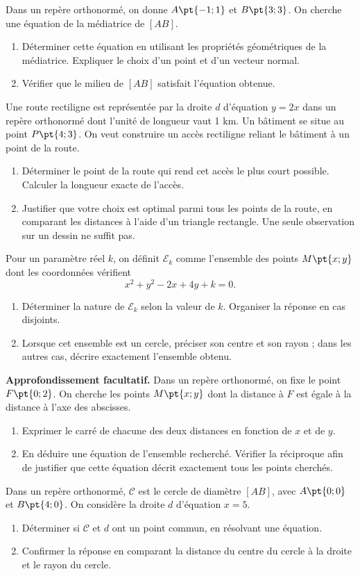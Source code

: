 Dans un repère orthonormé, on donne $A\pt{-1;1}$ et $B\pt{3;3}$. On cherche une équation de la médiatrice de $[AB]$.
\begin{enumerate}[label=\arabic*.]
\item Déterminer cette équation en utilisant les propriétés géométriques de la médiatrice. Expliquer le choix d’un point et d’un vecteur normal.
\item Vérifier que le milieu de $[AB]$ satisfait l’équation obtenue.
\end{enumerate}
Une route rectiligne est représentée par la droite $d$ d’équation $y=2x$ dans un repère orthonormé dont l’unité de longueur vaut 1 km. Un bâtiment se situe au point $P\pt{4;3}$. On veut construire un accès rectiligne reliant le bâtiment à un point de la route.
\begin{enumerate}[label=\arabic*.]
\item Déterminer le point de la route qui rend cet accès le plus court possible. Calculer la longueur exacte de l’accès.
\item Justifier que votre choix est optimal parmi tous les points de la route, en comparant les distances à l’aide d’un triangle rectangle. Une seule observation sur un dessin ne suffit pas.
\end{enumerate}
Pour un paramètre réel $k$, on définit $\mathcal E_k$ comme l’ensemble des points $M\pt{x;y}$ dont les coordonnées vérifient\[x^2+y^2-2x+4y+k=0.\]
\begin{enumerate}[label=\arabic*.]
\item Déterminer la nature de $\mathcal E_k$ selon la valeur de $k$. Organiser la réponse en cas disjoints.
\item Lorsque cet ensemble est un cercle, préciser son centre et son rayon ; dans les autres cas, décrire exactement l’ensemble obtenu.
\end{enumerate}
\textbf{Approfondissement facultatif.} Dans un repère orthonormé, on fixe le point $F\pt{0;2}$. On cherche les points $M\pt{x;y}$ dont la distance à $F$ est égale à la distance à l’axe des abscisses.
\begin{enumerate}[label=\arabic*.]
\item Exprimer le carré de chacune des deux distances en fonction de $x$ et de $y$.
\item En déduire une équation de l’ensemble recherché. Vérifier la réciproque afin de justifier que cette équation décrit exactement tous les points cherchés.
\end{enumerate}
Dans un repère orthonormé, $\mathcal C$ est le cercle de diamètre $[AB]$, avec $A\pt{0;0}$ et $B\pt{4;0}$. On considère la droite $d$ d’équation $x=5$.
\begin{enumerate}[label=\arabic*.]
\item Déterminer si $\mathcal C$ et $d$ ont un point commun, en résolvant une équation.
\item Confirmer la réponse en comparant la distance du centre du cercle à la droite et le rayon du cercle.
\end{enumerate}

